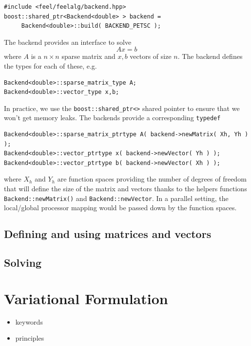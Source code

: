 \begin{lstlisting}
#include <feel/feelalg/backend.hpp>
boost::shared_ptr<Backend<double> > backend =
     Backend<double>::build( BACKEND_PETSC );
\end{lstlisting}

The backend provides an interface to solve
\begin{equation}
  \label{eq:8}
  A x = b
\end{equation}
\noindent
where $A$ is a $n \times n $ sparse matrix and $x,b$ vectors of size $n$.
The backend defines the \cpp types for  each of these, e.g.
\begin{lstlisting}
Backend<double>::sparse_matrix_type A;
Backend<double>::vector_type x,b;
\end{lstlisting}
\noindent
In practice, we use the \lstinline!boost::shared_ptr<>! shared pointer
to ensure that we won't get memory leaks. The backends provide a
corresponding \lstinline!typedef!


\begin{lstlisting}
Backend<double>::sparse_matrix_ptrtype A( backend->newMatrix( Xh, Yh ) );
Backend<double>::vector_ptrtype x( backend->newVector( Yh ) );
Backend<double>::vector_ptrtype b( backend->newVector( Xh ) );
\end{lstlisting}
\noindent
where $X_h$ and $Y_h$ are function spaces providing the number of
degrees of freedom that will define the size of the matrix and vectors
thanks to the helpers functions \lstinline!Backend::newMatrix()! and
\lstinline!Backend::newVector!. In a parallel setting, the
local/global processor mapping would be passed down by the function
spaces.

\subsection{Defining and using matrices and vectors}
\label{sec:defin-using-matr}

\subsection{Solving}
\label{sec:solving}


\section{Variational Formulation}
\label{sec:vari-form}

\begin{itemize}
\item keywords
\item principles
\end{itemize}

